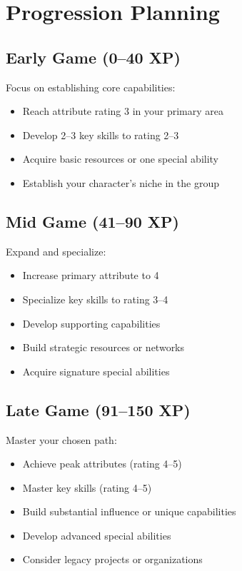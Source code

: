 \documentclass[11pt,twoside,openany]{book}
\begin{document}
\section*{Progression Planning} 

\subsection*{Early Game (0--40 XP)}

Focus on establishing core capabilities:
\begin{itemize}
\item Reach attribute rating 3 in your primary area
\item Develop 2--3 key skills to rating 2--3
\item Acquire basic resources or one special ability
\item Establish your character's niche in the group
\end{itemize}

\subsection*{Mid Game (41--90 XP)}

Expand and specialize:
\begin{itemize}
\item Increase primary attribute to 4
\item Specialize key skills to rating 3--4
\item Develop supporting capabilities
\item Build strategic resources or networks
\item Acquire signature special abilities
\end{itemize}

\subsection*{Late Game (91--150 XP)}

Master your chosen path:
\begin{itemize}
\item Achieve peak attributes (rating 4--5)
\item Master key skills (rating 4--5)
\item Build substantial influence or unique capabilities
\item Develop advanced special abilities
\item Consider legacy projects or organizations
\end{itemize}
\end{document}
